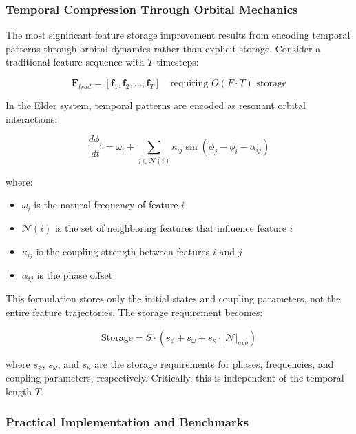 \subsubsection{Temporal Compression Through Orbital Mechanics}

The most significant feature storage improvement results from encoding temporal patterns through orbital dynamics rather than explicit storage. Consider a traditional feature sequence with $T$ timesteps:

\begin{equation}
\mathbf{F}_{trad} = [\mathbf{f}_1, \mathbf{f}_2, \ldots, \mathbf{f}_T] \quad \text{requiring } O(F \cdot T) \text{ storage}
\end{equation}

In the Elder system, temporal patterns are encoded as resonant orbital interactions:

\begin{equation}
\frac{d\phi_i}{dt} = \omega_i + \sum_{j \in \mathcal{N}(i)} \kappa_{ij} \sin(\phi_j - \phi_i - \alpha_{ij})
\end{equation}

where:
\begin{itemize}
    \item $\omega_i$ is the natural frequency of feature $i$
    \item $\mathcal{N}(i)$ is the set of neighboring features that influence feature $i$
    \item $\kappa_{ij}$ is the coupling strength between features $i$ and $j$
    \item $\alpha_{ij}$ is the phase offset
\end{itemize}

This formulation stores only the initial states and coupling parameters, not the entire feature trajectories. The storage requirement becomes:

\begin{equation}
\text{Storage} = S \cdot (s_\phi + s_\omega + s_\kappa \cdot |\mathcal{N}|_{avg})
\end{equation}

where $s_\phi$, $s_\omega$, and $s_\kappa$ are the storage requirements for phases, frequencies, and coupling parameters, respectively. Critically, this is independent of the temporal length $T$.

\subsubsection{Practical Implementation and Benchmarks}

